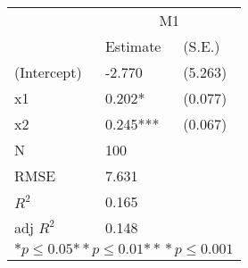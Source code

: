 \begin{tabular}{*{3}{l}}
\hline
                  & \multicolumn{2}{c}{M1}   \tabularnewline
                   &Estimate  &(S.E.)  \tabularnewline
 \hline
 \hline
   (Intercept)     &-2.770   &   (5.263) \tabularnewline
   x1              &0.202*   &   (0.077) \tabularnewline
   x2              &0.245***   &   (0.067) \tabularnewline
 \hline
 N                 &100       &        \tabularnewline
 RMSE             &7.631         & \tabularnewline
 $R^2$             &0.165         & \tabularnewline
 adj $R^2$         &0.148         & \tabularnewline
 \hline
\hline
 
 \multicolumn{3}{c}{${*  p}\le 0.05$${*\!\!*  p}\le 0.01$${*\!\!*\!\!*  p}\le 0.001$}\tabularnewline
 \end{tabular}